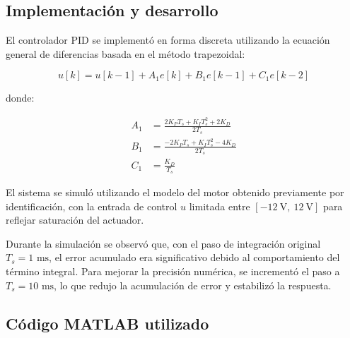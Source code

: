 \documentclass{article}
\begin{document}
\subsection*{Implementación y desarrollo}

El controlador PID se implementó en forma discreta utilizando la ecuación general de diferencias basada en el método trapezoidal:

\[
u[k] = u[k{-}1] + A_1 e[k] + B_1 e[k{-}1] + C_1 e[k{-}2]
\]

donde:

\begin{align*}
A_1 &= \frac{2K_P T_s + K_I T_s^2 + 2K_D}{2T_s} \\
B_1 &= \frac{-2K_P T_s + K_I T_s^2 - 4K_D}{2T_s} \\
C_1 &= \frac{K_D}{T_s}
\end{align*}

El sistema se simuló utilizando el modelo del motor obtenido previamente por identificación, con la entrada de control $u$ limitada entre $[-12\ \text{V},\ 12\ \text{V}]$ para reflejar saturación del actuador.

Durante la simulación se observó que, con el paso de integración original $T_s = 1\text{ ms}$, el error acumulado era significativo debido al comportamiento del término integral. Para mejorar la precisión numérica, se incrementó el paso a $T_s = 10\text{ ms}$, lo que redujo la acumulación de error y estabilizó la respuesta.

\subsection*{Código MATLAB utilizado}
\end{document}
